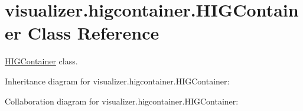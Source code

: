 \hypertarget{classvisualizer_1_1higcontainer_1_1HIGContainer}{}\section{visualizer.\+higcontainer.\+H\+I\+G\+Container Class Reference}
\label{classvisualizer_1_1higcontainer_1_1HIGContainer}


\hyperlink{classvisualizer_1_1higcontainer_1_1HIGContainer}{H\+I\+G\+Container} class.  




Inheritance diagram for visualizer.\+higcontainer.\+H\+I\+G\+Container\+:


Collaboration diagram for visualizer.\+higcontainer.\+H\+I\+G\+Container\+:
